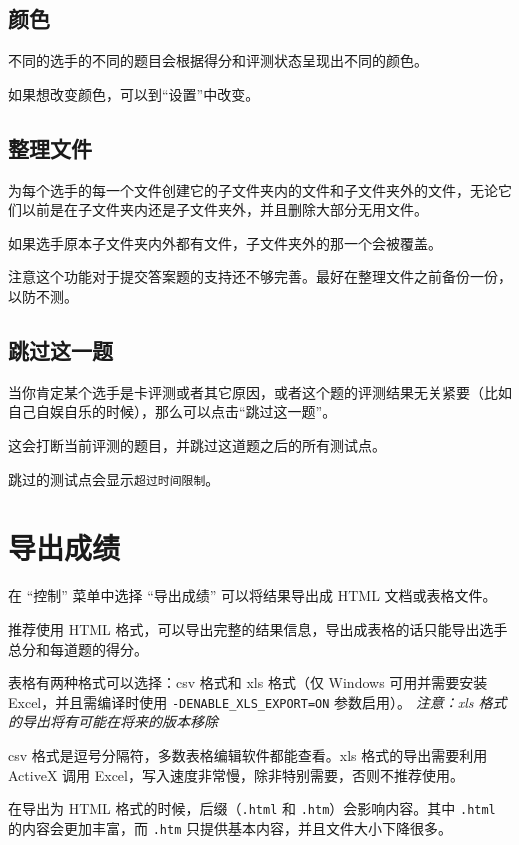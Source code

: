 \documentclass[UTF-8]{ctexart}
\begin{document}
		\subsection{颜色}

			不同的选手的不同的题目会根据得分和评测状态呈现出不同的颜色。

			如果想改变颜色，可以到“设置”中改变。

		\subsection{整理文件}

			为每个选手的每一个文件创建它的子文件夹内的文件和子文件夹外的文件，无论它们以前是在子文件夹内还是子文件夹外，并且删除大部分无用文件。

			如果选手原本子文件夹内外都有文件，子文件夹外的那一个会被覆盖。

			注意这个功能对于提交答案题的支持还不够完善。最好在整理文件之前备份一份，以防不测。

		\subsection{跳过这一题}

			当你肯定某个选手是卡评测或者其它原因，或者这个题的评测结果无关紧要（比如自己自娱自乐的时候），那么可以点击“跳过这一题”。

			这会打断当前评测的题目，并跳过这道题之后的所有测试点。

			跳过的测试点会显示\texttt{超过时间限制}。

	\newpage

	\section{导出成绩}

		在 “控制” 菜单中选择 “导出成绩” 可以将结果导出成 HTML 文档或表格文件。

		推荐使用 HTML 格式，可以导出完整的结果信息，导出成表格的话只能导出选手总分和每道题的得分。

		表格有两种格式可以选择：csv 格式和 xls 格式（仅 Windows 可用并需要安装 Excel，并且需编译时使用 \verb|-DENABLE_XLS_EXPORT=ON| 参数启用）。 \emph{注意：xls 格式的导出将有可能在将来的版本移除}

		csv 格式是逗号分隔符，多数表格编辑软件都能查看。xls 格式的导出需要利用 ActiveX 调用 Excel，写入速度非常慢，除非特别需要，否则不推荐使用。

		在导出为 HTML 格式的时候，后缀（\texttt{.html} 和 \texttt{.htm}）会影响内容。其中 \texttt{.html} 的内容会更加丰富，而 \texttt{.htm} 只提供基本内容，并且文件大小下降很多。
\end{document}
